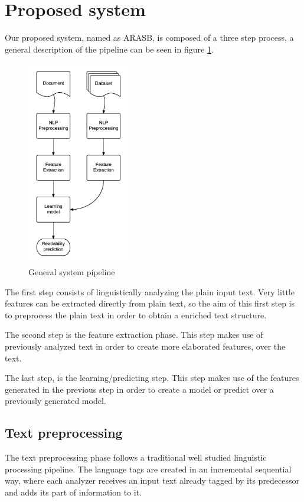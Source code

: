 \documentclass{acm_proc_article-sp}
\begin{document}
\section{Proposed system}
Our proposed system, named as ARASB, is composed of a three step process, a general description of the pipeline can be seen in figure \ref{systempipeline}.

\begin{figure}[h]
\centering
\includegraphics[width=0.4\textwidth]{systempipeline}
\caption{General system pipeline}
\label{systempipeline}
\end{figure}

 The first step consists of linguistically analyzing the plain input text. Very little features can be extracted directly from plain text, so the aim of this first step is to preprocess the plain text in order to obtain a enriched text structure.

The second step is the feature extraction phase. This step makes use of previously analyzed text in order to create more elaborated features, over the text.

The last step, is the learning/predicting step. This step makes use of the features generated in the previous step in order to create a model or predict over a previously generated model.





\subsection{Text preprocessing}
The text preprocessing phase follows a traditional well studied linguistic processing pipeline. The language tags are created in an incremental sequential way, where each analyzer  receives an input text already tagged by its predecessor and adds its part of information to it.
\end{document}
